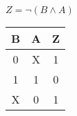 
\begin{center}
    {\(Z = \lnot (B \land A) \)}
    \begin{table}[h] %
        \begin{center}
            \begin{tabular}{|c|c||c|} \hline
            B & A & Z \\ \hline\hline
            0 & X & 1 \\ \hline
            1 & 1 & 0 \\ \hline
            X & 0 & 1 \\ \hline
            \end{tabular}
        \end{center}
    \end{table}
\end{center}
